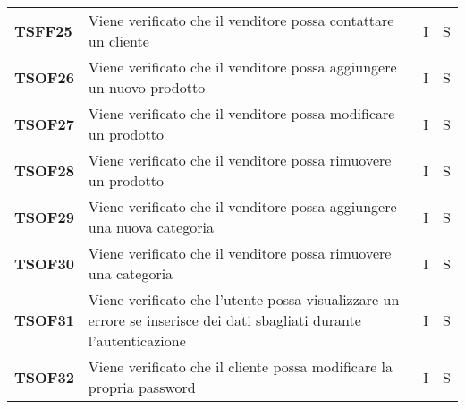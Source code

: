 \begin{center}
\begin{longtable}[!h]{p{60px} p{240px} p{35px} p{35px}}
        \textbf{TSFF25} & Viene verificato che il venditore possa contattare un cliente                                                        & I              & S              \\
        \textbf{TSOF26} & Viene verificato che il venditore possa aggiungere un nuovo prodotto                                                 & I              & S              \\
        \textbf{TSOF27} & Viene verificato che il venditore possa modificare un prodotto                                                       & I              & S              \\
        \textbf{TSOF28} & Viene verificato che il venditore possa rimuovere un prodotto                                                        & I              & S              \\
        \textbf{TSOF29} & Viene verificato che il venditore possa aggiungere una nuova categoria                                               & I              & S              \\
        \textbf{TSOF30} & Viene verificato che il venditore possa rimuovere una categoria                                                      & I              & S              \\
        \textbf{TSOF31} & Viene verificato che l'utente possa visualizzare un errore se inserisce dei dati sbagliati durante l'autenticazione  & I              & S              \\
        \textbf{TSOF32} & Viene verificato che il cliente possa modificare la propria password                                                 & I              & S              \\
    \end{longtable}
\end{center}
